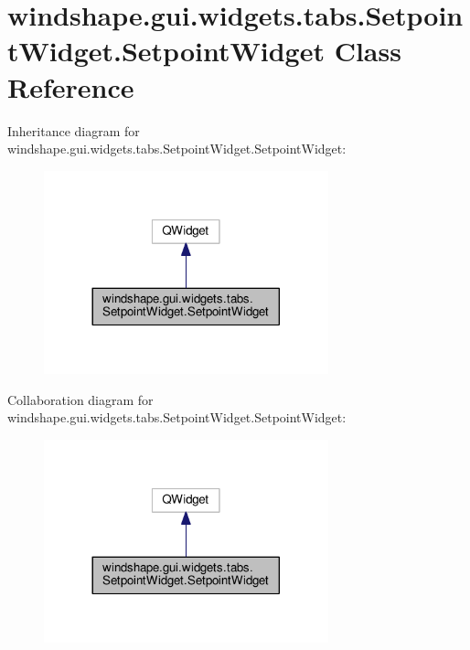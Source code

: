 \hypertarget{classwindshape_1_1gui_1_1widgets_1_1tabs_1_1_setpoint_widget_1_1_setpoint_widget}{}\section{windshape.\+gui.\+widgets.\+tabs.\+Setpoint\+Widget.\+Setpoint\+Widget Class Reference}
\label{classwindshape_1_1gui_1_1widgets_1_1tabs_1_1_setpoint_widget_1_1_setpoint_widget}


Inheritance diagram for windshape.\+gui.\+widgets.\+tabs.\+Setpoint\+Widget.\+Setpoint\+Widget\+:\nopagebreak
\begin{figure}[H]
\begin{center}
\leavevmode
\includegraphics[width=233pt]{classwindshape_1_1gui_1_1widgets_1_1tabs_1_1_setpoint_widget_1_1_setpoint_widget__inherit__graph}
\end{center}
\end{figure}


Collaboration diagram for windshape.\+gui.\+widgets.\+tabs.\+Setpoint\+Widget.\+Setpoint\+Widget\+:\nopagebreak
\begin{figure}[H]
\begin{center}
\leavevmode
\includegraphics[width=233pt]{classwindshape_1_1gui_1_1widgets_1_1tabs_1_1_setpoint_widget_1_1_setpoint_widget__coll__graph}
\end{center}
\end{figure}
